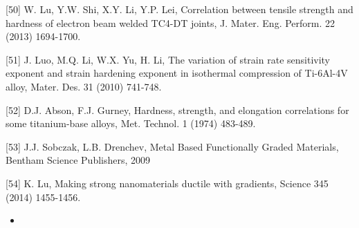 \documentclass[10pt]{article}
\begin{document}
[50] W. Lu, Y.W. Shi, X.Y. Li, Y.P. Lei, Correlation between tensile strength and hardness of electron beam welded TC4-DT joints, J. Mater. Eng. Perform. 22 (2013) 1694-1700.

[51] J. Luo, M.Q. Li, W.X. Yu, H. Li, The variation of strain rate sensitivity exponent and strain hardening exponent in isothermal compression of Ti-6Al-4V alloy, Mater. Des. 31 (2010) 741-748.

[52] D.J. Abson, F.J. Gurney, Hardness, strength, and elongation correlations for some titanium-base alloys, Met. Technol. 1 (1974) 483-489.

[53] J.J. Sobczak, L.B. Drenchev, Metal Based Functionally Graded Materials, Bentham Science Publishers, 2009

[54] K. Lu, Making strong nanomaterials ductile with gradients, Science 345 (2014) 1455-1456.

\begin{itemize}
  \item 
\end{itemize}
\end{document}
